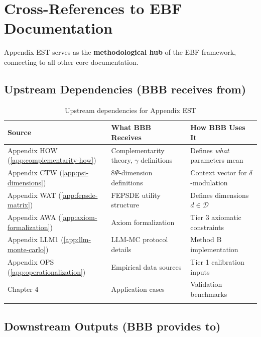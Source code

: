 \documentclass[11pt,a4paper]{article}
\theoremstyle{definition}
\begin{document}

\section{Cross-References to EBF Documentation}
\label{sec:bbb-crossref-expanded}

Appendix EST serves as the \textbf{methodological hub} of the EBF framework, 
connecting to all other core documentation.

\subsection{Upstream Dependencies (BBB receives from)}

\begin{longtable}{lp{4cm}p{6cm}}
\toprule
\textbf{Source} & \textbf{What BBB Receives} & \textbf{How BBB Uses It} \\
\midrule
\endfirsthead
Appendix HOW (\ref{app:complementarity-how}) & Complementarity theory, $\gamma$ definitions & Defines \textit{what} parameters mean \\
Appendix CTW (\ref{app:psi-dimensions}) & 8$\Psi$-dimension definitions & Context vector for $\delta$-modulation \\
Appendix WAT (\ref{app:fepsde-matrix}) & FEPSDE utility structure & Defines dimensions $d \in \mathcal{D}$ \\
Appendix AWA (\ref{app:axiom-formalization}) & Axiom formalization & Tier 3 axiomatic constraints \\
Appendix LLM1 (\ref{app:llm-monte-carlo}) & LLM-MC protocol details & Method B implementation \\
Appendix OPS (\ref{app:operationalization}) & Empirical data sources & Tier 1 calibration inputs \\
Chapter 4 & Application cases & Validation benchmarks \\
\bottomrule
\caption{Upstream dependencies for Appendix EST}
\end{longtable}

\subsection{Downstream Outputs (BBB provides to)}
\end{document}
